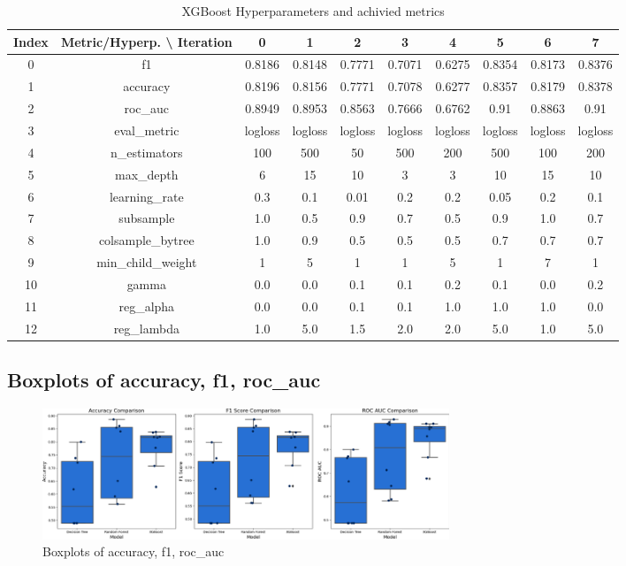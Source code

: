 \documentclass{article}%
\begin{document}
\begin{table}[h!]%
\caption{XGBoost Hyperparameters and achivied metrics}%
\vspace{0.2cm}%
\centering%
\begin{tabular}{|c||c||c||c||c||c||c||c||c||c|}%
\hline%
Index&Metric/Hyperp. \textbackslash{} Iteration&0&1&2&3&4&5&6&7\\%
\hline%
0&f1&0.8186&0.8148&0.7771&0.7071&0.6275&0.8354&0.8173&0.8376\\%
1&accuracy&0.8196&0.8156&0.7771&0.7078&0.6277&0.8357&0.8179&0.8378\\%
2&roc\_auc&0.8949&0.8953&0.8563&0.7666&0.6762&0.91&0.8863&0.91\\%
3&eval\_metric&logloss&logloss&logloss&logloss&logloss&logloss&logloss&logloss\\%
4&n\_estimators&100&500&50&500&200&500&100&200\\%
5&max\_depth&6&15&10&3&3&10&15&10\\%
6&learning\_rate&0.3&0.1&0.01&0.2&0.2&0.05&0.2&0.1\\%
7&subsample&1.0&0.5&0.9&0.7&0.5&0.9&1.0&0.7\\%
8&colsample\_bytree&1.0&0.9&0.5&0.5&0.5&0.7&0.7&0.7\\%
9&min\_child\_weight&1&5&1&1&5&1&7&1\\%
10&gamma&0.0&0.0&0.1&0.1&0.2&0.1&0.0&0.2\\%
11&reg\_alpha&0.0&0.0&0.1&0.1&1.0&1.0&1.0&0.0\\%
12&reg\_lambda&1.0&5.0&1.5&2.0&2.0&5.0&1.0&5.0\\%
\hline%
\end{tabular}%
\end{table}

%
\newpage%
\subsection{Boxplots of accuracy, f1, roc\_auc}%
\label{subsec:Boxplotsofaccuracy,f1,rocauc}%


\begin{figure}[h!]%
\centering%
\includegraphics[width=460px]{ModelOptimization/box_plots_metrics.png}%
\caption{Boxplots of accuracy, f1, roc\_auc}%
\end{figure}
\end{document}
